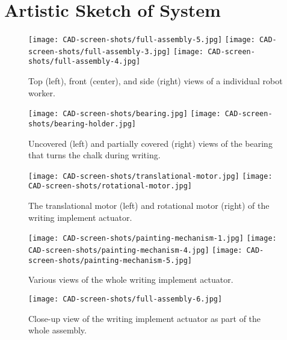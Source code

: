 
\section{Artistic Sketch of System}
\label{sec:artistic_sketch}


 

\begin{figure}
 \centering
 	\texttt{[image: CAD-screen-shots/full-assembly-5.jpg]}
    \texttt{[image: CAD-screen-shots/full-assembly-3.jpg]}
    \texttt{[image: CAD-screen-shots/full-assembly-4.jpg]}
	\caption{Top (left), front (center), and side (right) views of a individual robot worker.}
 \label{fig:full-robot}
\end{figure}

\begin{figure}
 \centering
 	\texttt{[image: CAD-screen-shots/bearing.jpg]}
 	\texttt{[image: CAD-screen-shots/bearing-holder.jpg]}
	\caption{Uncovered (left) and partially covered (right) views of the bearing that turns the chalk during writing.}
 \label{fig:chalk-turner}
\end{figure}

\begin{figure}
 \centering
  	\texttt{[image: CAD-screen-shots/translational-motor.jpg]}
  	\texttt{[image: CAD-screen-shots/rotational-motor.jpg]}
	\caption{The translational motor (left) and rotational motor (right) of the writing implement actuator.}
 \label{fig:use-cases}
\end{figure}

\begin{figure}
 \centering
  	\texttt{[image: CAD-screen-shots/painting-mechanism-1.jpg]}
  	\texttt{[image: CAD-screen-shots/painting-mechanism-4.jpg]}
  	\texttt{[image: CAD-screen-shots/painting-mechanism-5.jpg]}
	\caption{Various views of the whole writing implement actuator.}
 \label{fig:use-cases}
\end{figure}

\begin{figure}
 \centering
  	\texttt{[image: CAD-screen-shots/full-assembly-6.jpg]}
	\caption{Close-up view of the writing implement actuator as part of the whole assembly.}
 \label{fig:use-cases}
\end{figure}
